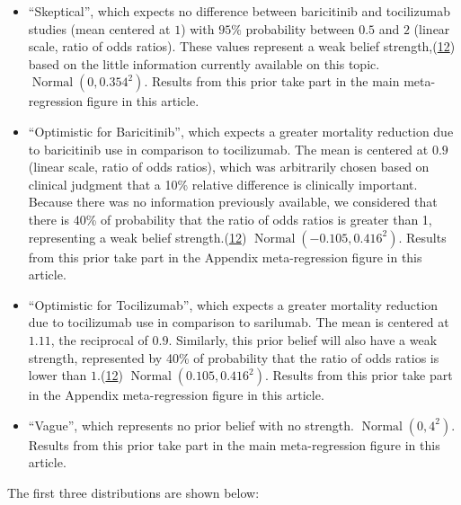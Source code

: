 \documentclass[
  12pt,
]{article}
\begin{document}
\begin{itemize}
\item
  ``Skeptical'', which expects no difference between baricitinib and
  tocilizumab studies (mean centered at \(1\)) with \(95\%\) probability
  between \(0.5\) and \(2\) (linear scale, ratio of odds ratios). These
  values represent a weak belief
  strength,(\protect\hyperlink{ref-zampieri2021}{12}) based on the
  little information currently available on this topic.
  \(\operatorname{Normal}(0, 0.354^2)\). Results from this prior take
  part in the main meta-regression figure in this article.
\item
  ``Optimistic for Baricitinib'', which expects a greater mortality
  reduction due to baricitinib use in comparison to tocilizumab. The
  mean is centered at \(0.9\) (linear scale, ratio of odds ratios),
  which was arbitrarily chosen based on clinical judgment that a 10\%
  relative difference is clinically important. Because there was no
  information previously available, we considered that there is 40\% of
  probability that the ratio of odds ratios is greater than 1,
  representing a weak belief
  strength.(\protect\hyperlink{ref-zampieri2021}{12})
  \(\operatorname{Normal}(-0.105, 0.416^2)\). Results from this prior
  take part in the Appendix meta-regression figure in this article.
\item
  ``Optimistic for Tocilizumab'', which expects a greater mortality
  reduction due to tocilizumab use in comparison to sarilumab. The mean
  is centered at \(1.11\), the reciprocal of \(0.9\). Similarly, this
  prior belief will also have a weak strength, represented by 40\% of
  probability that the ratio of odds ratios is lower than
  \(1\).(\protect\hyperlink{ref-zampieri2021}{12})
  \(\operatorname{Normal}(0.105, 0.416^2)\). Results from this prior
  take part in the Appendix meta-regression figure in this article.
\item
  ``Vague'', which represents no prior belief with no strength.
  \(\operatorname{Normal}(0, 4^2)\). Results from this prior take part
  in the main meta-regression figure in this article.
\end{itemize}

The first three distributions are shown below:
\end{document}
